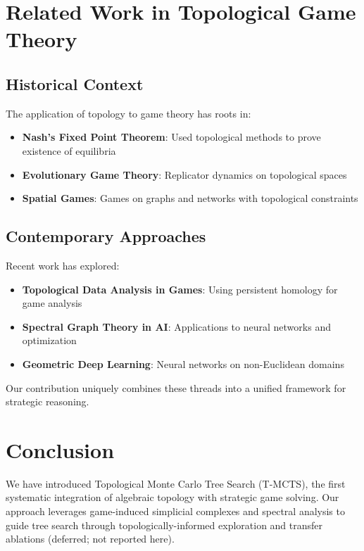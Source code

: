 \documentclass{article}
\begin{document}
\section{Related Work in Topological Game Theory}

\subsection{Historical Context}

The application of topology to game theory has roots in:

\begin{itemize}
\item \textbf{Nash's Fixed Point Theorem}: Used topological methods to prove existence of equilibria
\item \textbf{Evolutionary Game Theory}: Replicator dynamics on topological spaces
\item \textbf{Spatial Games}: Games on graphs and networks with topological constraints
\end{itemize}

\subsection{Contemporary Approaches}

Recent work has explored:

\begin{itemize}
\item \textbf{Topological Data Analysis in Games}: Using persistent homology for game analysis \citep{adams2017persistence}
\item \textbf{Spectral Graph Theory in AI}: Applications to neural networks and optimization
\item \textbf{Geometric Deep Learning}: Neural networks on non-Euclidean domains
\end{itemize}

Our contribution uniquely combines these threads into a unified framework for strategic reasoning.

\section{Conclusion}

We have introduced Topological Monte Carlo Tree Search (T-MCTS), the first systematic integration of algebraic topology with strategic game solving. Our approach leverages game-induced simplicial complexes and spectral analysis to guide tree search through topologically-informed exploration and transfer ablations (deferred; not reported here).
\end{document}
